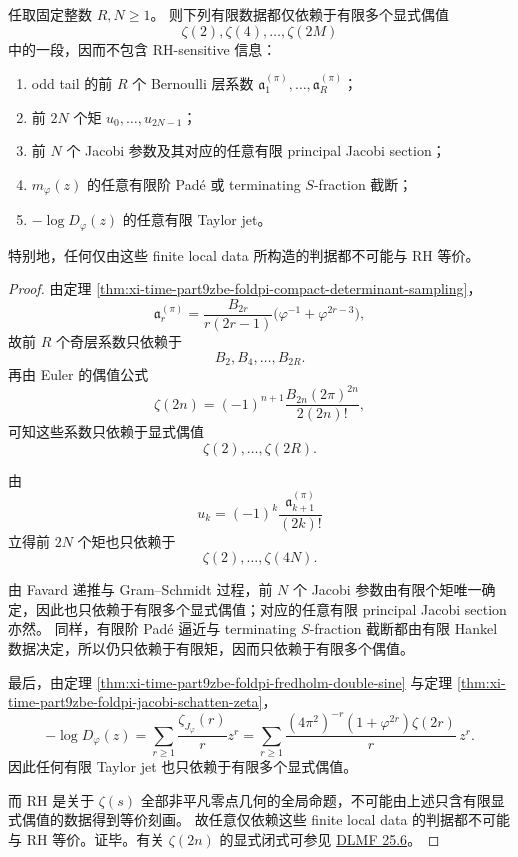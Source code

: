 \begin{theorem}\label{thm:xi-time-part9zbh-foldpi-finite-local-rh-blindness}
任取固定整数 \(R,N\ge 1\)。
则下列有限数据都仅依赖于有限多个显式偶值
\[
\zeta(2),\zeta(4),\dots,\zeta(2M)
\]
中的一段，因而不包含 RH-sensitive 信息：
\begin{enumerate}
  \item odd tail 的前 \(R\) 个 Bernoulli 层系数 \(\mathfrak a_1^{(\pi)},\dots,\mathfrak a_R^{(\pi)}\)；
  \item 前 \(2N\) 个矩 \(u_0,\dots,u_{2N-1}\)；
  \item 前 \(N\) 个 Jacobi 参数及其对应的任意有限 principal Jacobi section；
  \item \(m_\varphi(z)\) 的任意有限阶 Pad\'e 或 terminating \(S\)-fraction 截断；
  \item \(-\log D_\varphi(z)\) 的任意有限 Taylor jet。
\end{enumerate}
特别地，任何仅由这些 finite local data 所构造的判据都不可能与 RH 等价。
\end{theorem}
\begin{proof}
由定理 \ref{thm:xi-time-part9zbe-foldpi-compact-determinant-sampling}，
\[
\mathfrak a_r^{(\pi)}
=
\frac{B_{2r}}{r(2r-1)}
\bigl(\varphi^{-1}+\varphi^{2r-3}\bigr),
\]
故前 \(R\) 个奇层系数只依赖于
\[
B_2,B_4,\dots,B_{2R}.
\]
再由 Euler 的偶值公式
\[
\zeta(2n)=(-1)^{n+1}\frac{B_{2n}(2\pi)^{2n}}{2(2n)!},
\]
可知这些系数只依赖于显式偶值
\[
\zeta(2),\dots,\zeta(2R).
\]

由
\[
u_k=(-1)^k\frac{\mathfrak a_{k+1}^{(\pi)}}{(2k)!}
\]
立得前 \(2N\) 个矩也只依赖于
\[
\zeta(2),\dots,\zeta(4N).
\]

由 Favard 递推与 Gram--Schmidt 过程，前 \(N\) 个 Jacobi 参数由有限个矩唯一确定，因此也只依赖于有限多个显式偶值；对应的任意有限 principal Jacobi section 亦然。
同样，有限阶 Pad\'e 逼近与 terminating \(S\)-fraction 截断都由有限 Hankel 数据决定，所以仍只依赖于有限矩，因而只依赖于有限多个偶值。

最后，由定理 \ref{thm:xi-time-part9zbe-foldpi-fredholm-double-sine} 与定理 \ref{thm:xi-time-part9zbe-foldpi-jacobi-schatten-zeta}，
\[
-\log D_\varphi(z)
=
\sum_{r\ge 1}\frac{\zeta_{J_\varphi}(r)}{r}z^r
=
\sum_{r\ge 1}\frac{(4\pi^2)^{-r}(1+\varphi^{2r})\zeta(2r)}{r}\,z^r.
\]
因此任何有限 Taylor jet 也只依赖于有限多个显式偶值。

而 RH 是关于 \(\zeta(s)\) 全部非平凡零点几何的全局命题，不可能由上述只含有限显式偶值的数据得到等价刻画。
故任意仅依赖这些 finite local data 的判据都不可能与 RH 等价。证毕。有关 \(\zeta(2n)\) 的显式闭式可参见 \href{https://dlmf.nist.gov/25.6}{DLMF 25.6}。
\end{proof}

